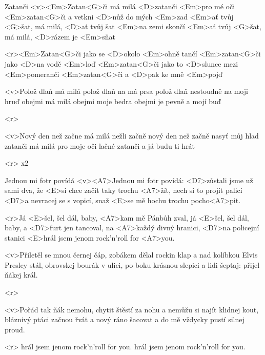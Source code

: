 \begin{song}{91}{Zatanči}{}
	<v><Em>Zatan<G>či má milá <D>zatanči <Em>pro mé oči
	<Em>zatan<G>či a vetkni <D>nůž do mých <Em>zad
	<Em>ať tvůj <G>šat, má milá, <D>ať tvůj šat <Em>na zemi skončí
	<Em>ať tvůj <G>šat, má milá, <D>rázem je <Em>sňat

	<r><Em>Zatan<G>či jako se <D>okolo <Em>ohně tančí
	<Em>zatan<G>či jako <D>na vodě <Em>loď
	<Em>zatan<G>či jako to <D>slunce mezi <Em>pomeranči
	<Em>zatan<G>či a <D>pak ke mně <Em>pojď

	<v>Polož dlaň má milá polož dlaň na má prsa
	polož dlaň nestoudně na moji hruď
	obejmi má milá obejmi moje bedra
	obejmi je pevně a mojí buď

	<r>

	<v>Nový den než začne má milá nežli začně
	nový den než začně nasyť můj hlad
	zatanči má milá pro moje oči lačné
	zatanči a já budu ti hrát

	<r>
	x2
\end{song}

\begin{song}{92}{Jednou mi fotr povídá}{}
	<v><A7>Jednou mi fotr povídá: <D7>zůstali jsme už sami dva,
	že <E>si chce začít taky trochu <A7>žít,
	nech si to projít palicí <D7>a nevracej se s vopicí,
	snaž <E>se mě hochu trochu pocho<A7>pit.

	<r>Já <E>šel, šel dál, baby, <A7>kam mě Pánbůh zval,
	já <E>šel, šel dál, baby, a <D7>furt jen tancoval,
	na <A7>každý divný hranici, <D7>na policejní stanici
	<E>hrál jsem jenom rock'n'roll for <A7>you.

	<v>Přiletěl se mnou černej čáp, zobákem dělal rockin klap
	a nad kolíbkou Elvis Presley stál,
	obrovskej bourák v ulici, po boku krásnou slepici 
	a lidi šeptaj: přijel ňákej král.

	<r>

	<v>Pořád tak ňák nemohu, chytit štěstí za nohu
	a nemůžu si najít klidnej kout,
	bláznivý ptáci začnou řvát a nový ráno šacovat
	a do mě vždycky pustí silnej proud.

	<r>
	hrál jsem jenom rock'n'roll for you.
	hrál jsem jenom rock'n'roll for you.
\end{song}


